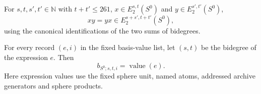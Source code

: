 \begin{theorem}
\label{frontier:E2Computation:1652f2bec247}
For $s,t,s',t'\in\mathbb N$ with $t+t'\leq261$, $x\in E_2^{s,t}(S^0)$ and $y\in E_2^{s',t'}(S^0)$,
\[xy=yx\in E_2^{s+s',t+t'}(S^0),\]
using the canonical identifications of the two sums of bidegrees.
\end{theorem}

\begin{theorem}
\label{frontier:E2Computation:724420370993}
For every record $(e,i)$ in the fixed basis-value list, let $(s,t)$ be the bidegree of the expression $e$. Then
\[b_{S^0;s,t,i}=\operatorname{value}(e).\]
Here expression values use the fixed sphere unit, named atoms, addressed archive generators and sphere products.
\end{theorem}
